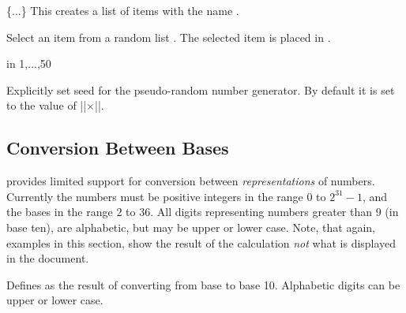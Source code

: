 \begin{command}{\pgfmathdeclarerandomlist{}\{...\}}
	This creates a list of items with the name .
\end{command}

\begin{command}{\pgfmathrandomitem{}}
	Select an item from a random list . The
	selected item is placed in .
\end{command}

\begin{codeexample}[]
\begin{pgfpicture}
   \foreach \a in {1,...,50}{
      \color{\c!40!white}
   }	  
\end{pgfpicture}
\end{codeexample}

\begin{command}{\pgfmathsetseed{}}
  Explicitly set seed for the pseudo-random number generator. By
  default it is set to the value of |\time|$\times$|\year|.
\end{command}


      
\subsection{Conversion Between Bases}
	
\label{pgfmath-bases}

\pgfname{} provides limited support for conversion between 
\emph{representations} of numbers. Currently the numbers must be
positive integers in the range $0$ to $2^{31}-1$, and the bases in the
range $2$ to $36$. All digits representing numbers greater than 9 (in
base ten), are alphabetic, but may be upper or lower case. Note, that
again, examples in this section, show the result of the calculation
\emph{not} what is displayed in the document.

\begin{command}{\pgfmathbasetodec{}}
	Defines  as the result of converting  from
	base  to base 10. Alphabetic digits can be upper or lower
	case.

\medskip

\end{command}

